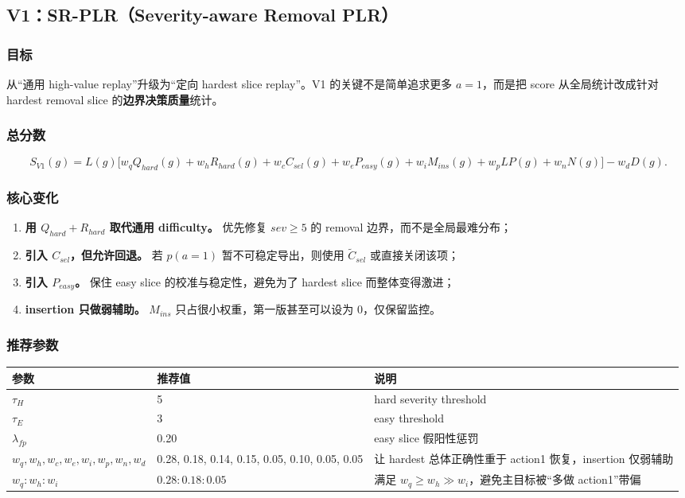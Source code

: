 \documentclass[11pt,a4paper]{ctexart}
\begin{document}
\subsection{V1：SR-PLR（Severity-aware Removal PLR）}
\subsubsection*{目标}
从“通用 high-value replay”升级为“定向 hardest slice replay”。V1 的关键不是简单追求更多 \(a=1\)，而是把 score 从全局统计改成针对 hardest removal slice 的\textbf{边界决策质量}统计。

\subsubsection*{总分数}
\begin{equation}
S_{V1}(g)=L(g)\big[w_q Q_{hard}(g)+w_h R_{hard}(g)+w_c C_{sel}(g)+w_e P_{easy}(g)+w_i M_{ins}(g)+w_p LP(g)+w_n N(g)\big]-w_d D(g).
\label{eq:sv1}
\end{equation}

\subsubsection*{核心变化}
\begin{enumerate}[leftmargin=2.2em,itemsep=0.25em]
    \item \textbf{用 \(Q_{hard}+R_{hard}\) 取代通用 difficulty。} 优先修复 \(sev\ge 5\) 的 removal 边界，而不是全局最难分布；
    \item \textbf{引入 \(C_{sel}\)，但允许回退。} 若 \(p(a=1)\) 暂不可稳定导出，则使用 \(\tilde C_{sel}\) 或直接关闭该项；
    \item \textbf{引入 \(P_{easy}\)。} 保住 easy slice 的校准与稳定性，避免为了 hardest slice 而整体变得激进；
    \item \textbf{insertion 只做弱辅助。} \(M_{ins}\) 只占很小权重，第一版甚至可以设为 0，仅保留监控。
\end{enumerate}

\subsubsection*{推荐参数}
\begin{center}
\begin{tabular}{p{4.0cm}p{3.0cm}p{6.4cm}}
\toprule
参数 & 推荐值 & 说明 \\
\midrule
\(\tau_H\) & 5 & hard severity threshold \\
\(\tau_E\) & 3 & easy threshold \\
\(\lambda_{fp}\) & 0.20 & easy slice 假阳性惩罚 \\
\(w_q,w_h,w_c,w_e,w_i,w_p,w_n,w_d\) & 0.28, 0.18, 0.14, 0.15, 0.05, 0.10, 0.05, 0.05 & 让 hardest 总体正确性重于 action1 恢复，insertion 仅弱辅助 \\
\(w_q:w_h:w_i\) & \(0.28:0.18:0.05\) & 满足 \(w_q \ge w_h \gg w_i\)，避免主目标被“多做 action1”带偏 \\
\bottomrule
\end{tabular}
\end{center}
\end{document}
